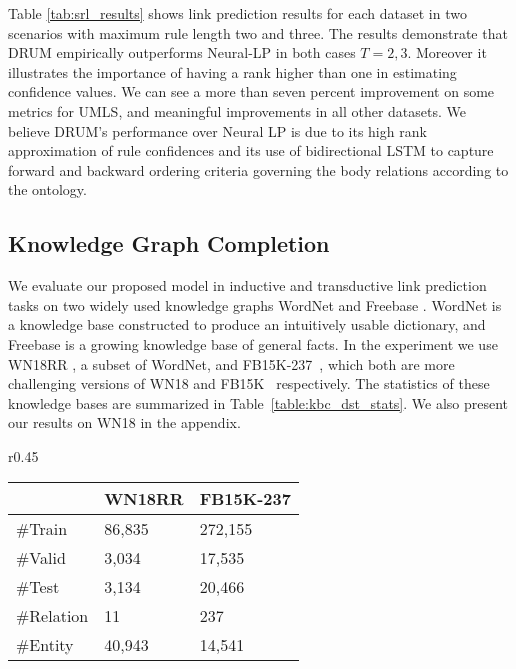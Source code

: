 \documentclass{article}
\begin{document}
Table \ref{tab:srl_results} shows link prediction results for each dataset in two scenarios with maximum rule length two and three. The results demonstrate that DRUM empirically outperforms Neural-LP in both cases $T=2,3$. Moreover it illustrates the importance of having a rank higher than one in estimating confidence values. We can see a more than seven percent improvement on some metrics for UMLS, and meaningful improvements in all other datasets. We believe DRUM's performance over Neural LP is due to its high rank approximation of rule confidences and its use of bidirectional LSTM to capture forward and backward ordering criteria governing the body relations according to the ontology.


\subsection{Knowledge Graph Completion}

We evaluate our proposed model in inductive and transductive link prediction tasks on two widely used knowledge graphs WordNet \citep{kilgarriff2000wordnet, miller1995wordnet} and Freebase \citep{bollacker2008freebase}. WordNet is a knowledge base constructed to produce an intuitively usable dictionary, and Freebase is a growing knowledge base of general facts. In the experiment we use WN18RR \citep{dettmers2018convolutional}, a subset of WordNet, and FB15K-237~\citep{toutanova2015observed}, which both are more challenging versions of  WN18 and FB15K~\citep{bordes2013translating} respectively. The statistics of these knowledge bases are summarized in Table~\ref{table:kbc_dst_stats}. We also present our results on WN18  \citep{bordes2013translating} in the appendix.

\begin{wraptable}{r}{0.45 \textwidth}
\vspace{-4pt}
\caption{Datasets statistics for Knowledge base completion.}
\label{table:kbc_dst_stats}
\centering
\begin{tabular}{lll}
\toprule
& \textbf{WN18RR} & \textbf{FB15K-237} \\
\midrule
\#Train & 86,835 & 272,155 \\
\#Valid & 3,034 & 17,535 \\
\#Test & 3,134 & 20,466\\
\#Relation & 11 & 237 \\
\#Entity & 40,943 &  14,541 \\
\bottomrule
\end{tabular}
\vspace{-10pt}
\end{wraptable}
\end{document}
